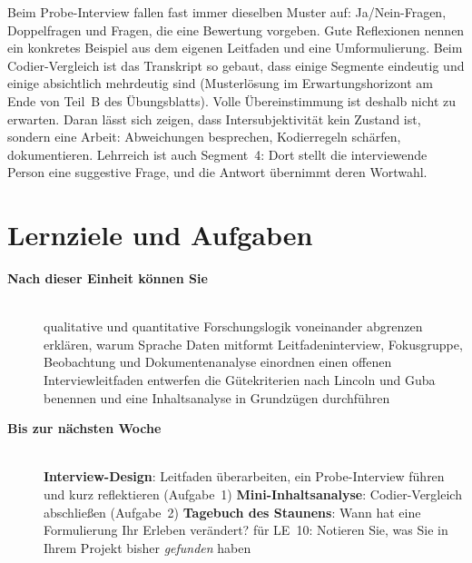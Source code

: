 \begin{lehrhinweis}
Beim Probe-Interview fallen fast immer dieselben Muster auf:
Ja/Nein-Fragen, Doppelfragen und Fragen, die eine Bewertung vorgeben.
Gute Reflexionen nennen ein konkretes Beispiel aus dem eigenen Leitfaden
und eine Umformulierung. Beim Codier-Vergleich ist das Transkript so
gebaut, dass einige Segmente eindeutig und einige absichtlich mehrdeutig
sind (Musterlösung im Erwartungshorizont am Ende von Teil~B des
Übungsblatts). Volle
Übereinstimmung ist deshalb nicht zu erwarten. Daran lässt
sich zeigen, dass Intersubjektivität kein Zustand ist, sondern eine
Arbeit: Abweichungen besprechen, Kodierregeln schärfen, dokumentieren.
Lehrreich ist auch Segment~4: Dort stellt die interviewende Person eine
suggestive Frage, und die Antwort übernimmt deren Wortwahl.
\end{lehrhinweis}

\section{Lernziele und Aufgaben}
\begin{description}
\item[{\rot\bf Nach dieser Einheit können Sie}]~\\[-\lblskip]
\bi
  \ite qualitative und quantitative Forschungslogik voneinander abgrenzen
  \ite erklären, warum Sprache Daten mitformt
  \ite Leitfadeninterview, Fokusgruppe, Beobachtung und
    Dokumentenanalyse einordnen
  \ite einen offenen Interviewleitfaden entwerfen
  \ite die Gütekriterien nach Lincoln und Guba benennen und eine
    Inhaltsanalyse in Grundzügen durchführen
\ei
\os{\newpage}

\item[{\rot\bf Bis zur nächsten Woche}]~\\[-\lblskip]
\bi
  \ite \textbf{Interview-Design}: Leitfaden überarbeiten, ein
    Probe-Interview führen und kurz reflektieren (Aufgabe~1)
  \ite \textbf{Mini-Inhaltsanalyse}: Codier-Vergleich abschließen
    (Aufgabe~2)
  \ite \textbf{Tagebuch des Staunens}: Wann hat eine Formulierung Ihr
    Erleben verändert?
  \ite für LE~10: Notieren Sie, was Sie in Ihrem Projekt bisher
    \emph{gefunden} haben
\ei
\os{\newpage}
\end{description}

